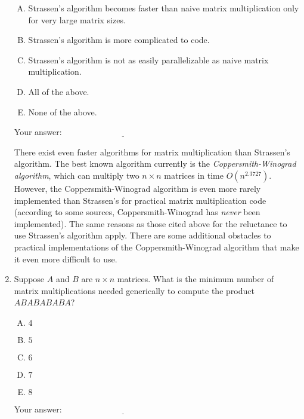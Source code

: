 \documentclass[10pt]{amsart}
\begin{document}
\begin{enumerate}
  \begin{enumerate}[(A)]
  \item Strassen's algorithm becomes faster than naive matrix
    multiplication only for very large matrix sizes.
  \item Strassen's algorithm is more complicated to code.
  \item Strassen's algorithm is not as easily parallelizable as naive
    matrix multiplication.
  \item All of the above.
  \item None of the above.
  \end{enumerate}

  \vspace{0.1in}
  Your answer: $\underline{\qquad\qquad\qquad\qquad\qquad\qquad\qquad}$
  \vspace{0.1in}

  There exist even faster algorithms for matrix multiplication than
  Strassen's algorithm. The best known algorithm currently is the {\em
    Coppersmith-Winograd algorithm}, which can multiply two $n \times
  n$ matrices in time $O(n^{2.3727})$. However, the
  Coppersmith-Winograd algorithm is even more rarely implemented than
  Strassen's for practical matrix multiplication code (according to
  some sources, Coppersmith-Winograd has {\em never} been
  implemented). The same reasons as those cited above for the
  reluctance to use Strassen's algorithm apply. There are some
  additional obstacles to practical implementations of the
  Coppersmith-Winograd algorithm that make it even more difficult to
  use.

\item Suppose $A$ and $B$ are $n \times n$ matrices. What is the
  minimum number of matrix multiplications needed generically to
  compute the product $ABABABABA$?

   \begin{enumerate}[(A)]
   \item $4$
   \item $5$
   \item $6$
   \item $7$
   \item $8$
   \end{enumerate}

   \vspace{0.1in}
   Your answer: $\underline{\qquad\qquad\qquad\qquad\qquad\qquad\qquad}$
   \vspace{0.1in}


\end{enumerate}
\end{document}
